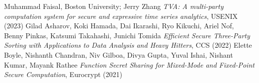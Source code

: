 \begin{comment}
\subsection{Spline with Public Intervals technique from \cite{Eu21}}
\underline{Example query:} COUNT over time intervals of length $\lambda$ across individuals in a cohort \\
Consider n rows, t represents timestamp attribute \\ 
Communication: $n(\lambda l_t + 2l_t + g \log n)$ bits \\
Rounds: $O(g)$ rounds?

\section{Comments on Our Explorations}
Modified Tumbling Window Operator with Primitives from \cite{Ha22} outperforms Spline with Public Intervals technique from \cite{Eu21} ($O(n\log g\log n)$ vs $O(ng\log n)$ ). For a large g, the latter technique is at a disadvantage. However, if the intervals are not equisized, the latter is at an advantage as $w_{id}$ cannot be computed without comparing with the start and end of the intervals. We are yet to come up with a use case to apply tumbling window operator with arbitrary sized windows.
\end{comment}

\begin{thebibliography}{99}

 Muhammad Faisal, Boston University; Jerry Zhang \emph{TVA: A multi-party computation system for secure and expressive time series analytics}, {USENIX} (2023)
 Gilad Asharov, Koki Hamada, Dai Ikarashi, Ryo Kikuchi, Ariel Nof, Benny Pinkas, Katsumi Takahashi, Junichi Tomida \emph{Efficient Secure Three-Party Sorting with Applications to Data Analysis and Heavy Hitters}, {CCS} (2022)
 Elette Boyle, Nishanth Chandran, Niv Gilboa, Divya Gupta, Yuval Ishai, Nishant Kumar, Mayank Rathee \emph{Function Secret Sharing for Mixed-Mode and Fixed-Point Secure Computation}, {Eurocrypt} (2021)

\end{thebibliography}

%
